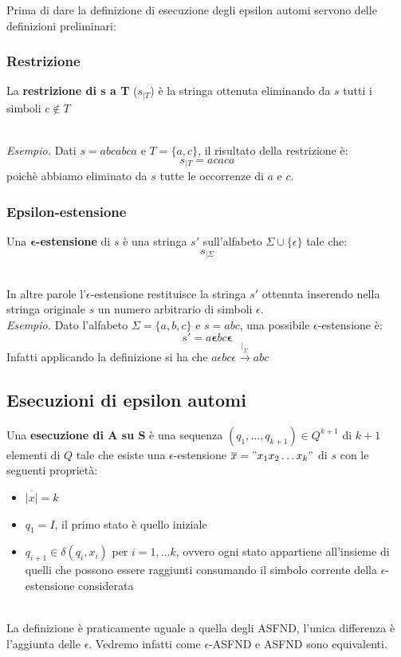 \noindent Prima di dare la definizione di esecuzione degli epsilon automi servono delle definizioni preliminari:

\subsubsection{Restrizione}
\colorbox{SALZO}{\parbox{\dimexpr\linewidth-2\fboxsep}{\begin{definition}
   La \textbf{restrizione di s a T} ($s_{|T}$) è la stringa ottenuta eliminando da $s$ tutti i simboli $c\notin T$
\end{definition}}}\smallskip\\
\textit{Esempio.} Dati $s = abcabca$ e $T = \{ a,c  \}$, il risultato della restrizione è:
\[  s_{|T} = acaca \]
poichè abbiamo eliminato da $s$ tutte le occorrenze di $a$ e $c$.


\subsubsection{Epsilon-estensione}
\colorbox{SALZO}{\parbox{\dimexpr\linewidth-2\fboxsep}{\begin{definition}
   Una $\bm{\epsilon}$\textbf{-estensione} di $s$ è una stringa $s'$ sull'alfabeto $\Sigma \cup \{\epsilon \}$ tale che:
   \[   s_{|\Sigma}   \]
\end{definition}}}\smallskip\\
In altre parole l'$\epsilon$-estensione restituisce la stringa $s'$ ottenuta inserendo nella stringa originale $s$ un numero arbitrario
di simboli $\epsilon$.\\
\textit{Esempio.} Dato l'alfabeto $\Sigma = \{ a,b,c  \}$ e $s = abc$, una possibile $\epsilon$-estensione è:
\[  s' = a\bm{\epsilon} bc\bm{\epsilon}    \]
Infatti applicando la definizione si ha che $a\epsilon b c \epsilon  \xrightarrow{|_{\Sigma}} abc$


\subsection{Esecuzioni di epsilon automi}
\colorbox{SALZO}{\parbox{\dimexpr\linewidth-2\fboxsep}{\begin{definition}
   Una \textbf{esecuzione di A su S} è una sequenza $(q_1,\dots,q_{k+1}) \in Q^{k+1}$ di $k+1$ elementi di $Q$ tale che esiste una 
   $\epsilon$-estensione $\overline{x} = "x_1x_2\dots x_k"$ di $s$ con le seguenti proprietà:
   \begin{itemize}
    \item $\overline{|x|} = k$
    \item $q_1 = I$, il primo stato è quello iniziale
    \item $q_{i+1} \in \delta(q_i,x_i)$ per $i = 1,\dots k$, ovvero ogni stato appartiene all'insieme di quelli che possono essere raggiunti
    consumando il simbolo corrente della $\epsilon$-estensione considerata
   \end{itemize}
\end{definition}}}\smallskip\\
La definizione è praticamente uguale a quella degli ASFND, l'unica differenza è l'aggiunta delle $\epsilon$. Vedremo infatti come 
$\epsilon$-ASFND e ASFND sono equivalenti.


